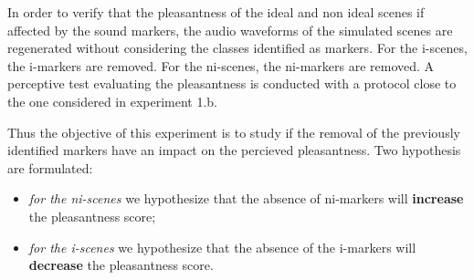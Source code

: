 \documentclass[twoside,twocolumn]{article}
\begin{document}

In order to verify that the pleasantness of the ideal and non ideal scenes if affected by the sound markers, the audio waveforms of the simulated scenes are regenerated without considering the classes identified as markers. For the i-scenes, the i-markers are removed. For the ni-scenes, the ni-markers are removed. A perceptive test evaluating the pleasantness is conducted with a protocol close to the one considered in experiment 1.b.


Thus the objective of this experiment is to study if the removal of the previously identified markers have an impact on the percieved pleasantness. Two hypothesis are formulated:


\begin{itemize}
\item \emph{for the ni-scenes} we hypothesize that the absence of ni-markers will \textbf{increase} the pleasantness score;
\item \emph{for the i-scenes} we hypothesize that the absence of the i-markers will \textbf{decrease} the pleasantness score.
\end{itemize}

\end{document}
